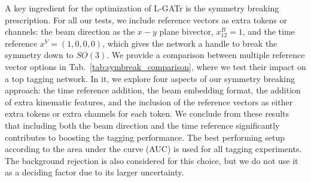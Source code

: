 \documentclass[submission, Phys]{SciPost}
\begin{document}
A key ingredient for the optimization of L-GATr is the symmetry breaking prescription. For all our tests, we include reference vectors as extra tokens or channels: the beam direction as the $x-y$ plane bivector, $x^B_{12} = 1$, and the time reference $x^V = (1,0,0,0)$, which gives the network a handle to break the symmetry down to $SO(3)$. We provide a comparison between multiple reference vector options in Tab.~\ref{tab:symbreak_comparison}, where we test their impact on a top tagging network. In it, we explore four aspects of our symmetry breaking approach: the time reference addition, the beam embedding format, the addition of extra kinematic features, and the inclusion of the reference vectors as either extra tokens or extra channels for each token. We conclude from these results that including both the beam direction and the time reference significantly contributes to boosting the tagging performance. The best performing setup according to the area under the curve (AUC) is used for all tagging experiments. The background rejection is also considered for this choice, but we do not use it as a deciding factor due to its larger uncertainty.
\end{document}
